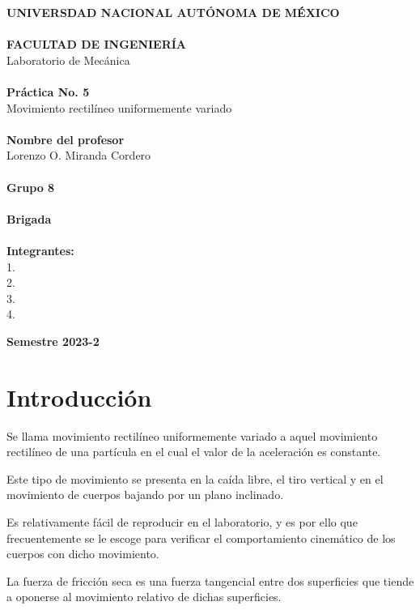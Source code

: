 \documentclass[12pt, titlepage]{report}
\begin{document}
\begin{titlepage}
\begin{center}
            \large \textbf{UNIVERSDAD NACIONAL AUTÓNOMA DE MÉXICO\\}
            \large \textbf{\\FACULTAD DE INGENIERÍA\\} 
            \hfill \break
            \large Laboratorio de Mecánica\\
            \Large \textbf{\\Práctica No. 5\\}
            \large Movimiento rectilíneo uniformemente variado\\
            \Large \textbf{\\Nombre del profesor\\}
            \large Lorenzo O. Miranda Cordero\\
            \Large \textbf{\\Grupo 8\\}
            \Large \textbf{\\Brigada \\}
            \Large \textbf{\\Integrantes:\\}
            \Large 1. \\2. \\3. \\4. \\
        \end{center}
        \begin{flushright}
            \Large \textbf{Semestre 2023-2}
        \end{flushright}
    \end{titlepage}

    \section*{Introducción}
    Se llama movimiento rectilíneo uniformemente variado a aquel movimiento rectilíneo de una partícula en el cual el valor de la aceleración es constante.

    Este tipo de movimiento se presenta en la caída libre, el tiro vertical y en el movimiento de cuerpos bajando por un plano inclinado.

    Es relativamente fácil de reproducir en el laboratorio, y es por ello que frecuentemente se le escoge para verificar el comportamiento cinemático de los cuerpos con dicho movimiento.

    La fuerza de fricción seca es una fuerza tangencial entre dos superficies que tiende a oponerse al movimiento relativo de dichas superficies.
\end{document}
